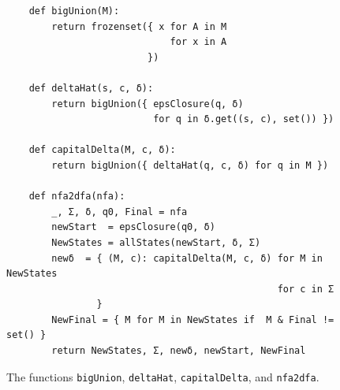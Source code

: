 \begin{figure}[!ht]
\centering
\begin{verbatim}
    def bigUnion(M):
        return frozenset({ x for A in M
                             for x in A
                         })

    def deltaHat(s, c, δ):
        return bigUnion({ epsClosure(q, δ)
                          for q in δ.get((s, c), set()) })

    def capitalDelta(M, c, δ):
        return bigUnion({ deltaHat(q, c, δ) for q in M })

    def nfa2dfa(nfa):
        _, Σ, δ, q0, Final = nfa
        newStart  = epsClosure(q0, δ)
        NewStates = allStates(newStart, δ, Σ)
        newδ  = { (M, c): capitalDelta(M, c, δ) for M in NewStates
                                                for c in Σ
                }
        NewFinal = { M for M in NewStates if  M & Final != set() }
        return NewStates, Σ, newδ, newStart, NewFinal
\end{verbatim}
\vspace*{-0.3cm}
\caption{The functions \texttt{bigUnion}, \texttt{deltaHat}, \texttt{capitalDelta}, and \texttt{nfa2dfa}.}
\label{fig:01-NFA-2-DFA.ipynb:nfa2dfa}
\end{figure}

